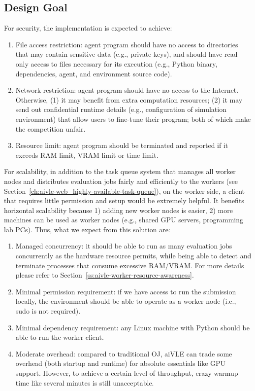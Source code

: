 \subsection{Design Goal}
\label{ss:aivle-worker-design-goal}
For security, the implementation is expected to achieve:
\begin{enumerate}
    \item File access restriction: agent program should have no access to directories that may contain sensitive data (e.g., private keys), and should have read only access to files necessary for its execution (e.g., Python binary, dependencies, agent, and environment source code).
    \item Network restriction: agent program should have no access to the Internet. Otherwise, (1) it may benefit from extra computation resources; (2) it may send out confidential runtime details (e.g., configuration of simulation environment) that allow users to fine-tune their program; both of which make the competition unfair.
    \item Resource limit: agent program should be terminated and reported if it exceeds RAM limit, VRAM limit or time limit.
\end{enumerate}

For scalability, in addition to the task queue system that manages all worker nodes and distributes evaluation jobs fairly and efficiently to the workers (see Section~\ref{ch:aivle-web_highly-available-task-queue}), on the worker side, a client that requires little permission and setup would be extremely helpful. It benefits horizontal scalability because 1) adding new worker nodes is easier, 2) more machines can be used as worker nodes (e.g., shared GPU servers, programming lab PCs). Thus, what we expect from this solution are:
\begin{enumerate}
    \item Managed concurrency: it should be able to run as many evaluation jobs concurrently as the hardware resource permits, while being able to detect and terminate processes that consume excessive RAM/VRAM. For more details please refer to Section~\ref{ss:aivle-worker-resource-awareness}.
    \item Minimal permission requirement: if we have access to run the submission locally, the environment should be able to operate as a worker node (i.e., sudo is not required).
    \item Minimal dependency requirement: any Linux machine with Python should be able to run the worker client.
    \item Moderate overhead: compared to traditional OJ, aiVLE can trade some overhead (both startup and runtime) for absolute essentials like GPU support. However, to achieve a certain level of throughput, crazy warmup time like several minutes is still unacceptable.
\end{enumerate}

